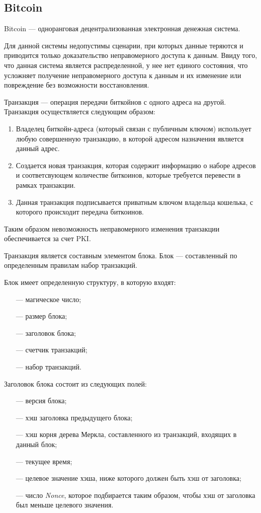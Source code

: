 \clearpage

\subsection{Bitcoin}

Bitcoin\cite{bitcoin} --- одноранговая децентрализованная электронная денежная система.

Для данной системы недопустимы сценарии, при которых данные теряются и приводится только доказательство неправомерного доступа к данным. Ввиду того, что данная система является распределенной, у нее нет единого состояния, что усложняет получение неправомерного доступа к данным и их изменение или повреждение без возможности восстановления.

Транзакция --- операция передачи биткойнов с одного адреса на другой. Транзакция осуществляется следующим образом:

\begin{enumerate}
    \item Владелец биткойн-адреса (который связан с публичным ключом) использует любую совершенную транзакцию, в которой адресом назначения является данный адрес.
    \item Создается новая транзакция, которая содержит информацию о наборе адресов и соответсвующем количестве биткоинов, которые требуется перевести в рамках транзакции.
    \item Данная транзакция подписывается приватным ключом владельца кошелька, с которого происходит передача биткоинов.
\end{enumerate}

Таким образом невозможность неправомерного изменения транзакции обеспечивается за счет PKI\cite{pki}.

Транзакция является составным элементом блока. Блок --- составленный по определенным правилам набор транзакций.

Блок имеет определенную структуру, в которую входят:
\begin{itemize}
    \item[---] магическое число;
    \item[---] размер блока;
    \item[---] заголовок блока;
    \item[---] счетчик транзакций;
    \item[---] набор транзакций.
\end{itemize}

Заголовок блока состоит из следующих полей:
\begin{itemize}
    \item[---] версия блока;
    \item[---] хэш заголовка предыдущего блока;
    \item[---] хэш корня дерева Меркла, составленного из транзакций, входящих в данный блок;
    \item[---] текущее время;
    \item[---] целевое значение хэша, ниже которого должен быть хэш от заголовка;
    \item[---] число \textit{Nonce}, которое подбирается таким образом, чтобы хэш от заголовка был меньше целевого значения.
\end{itemize}


